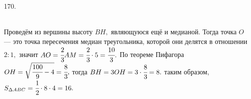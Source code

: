 170. \begin{figure}[ht!]
\end{figure}\\
Проведём из вершины высоту $BH,$ являющуюся ещё и медианой. Тогда точка $O$ --- это точка пересечения медиан треугольника, которой они делятся в отношении $2:1,$ значит $AO=\cfrac{2}{3}AM=\cfrac{2}{3}\cdot5=\cfrac{10}{3}.$ По теореме Пифагора $OH=\sqrt{\cfrac{100}{9}-4}=\cfrac{8}{3},$ тогда $BH=3OH=3\cdot\cfrac{8}{3}=8.$ таким образом, $S_{\Delta ABC}=\cfrac{1}{2}\cdot8\cdot4=16.$\newpage\noindent
